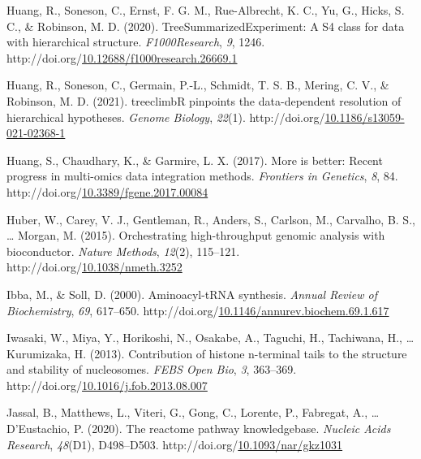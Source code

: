 \documentclass[12pt,twoside]{reedthesis}
\newlength{\cslhangindent}
\newenvironment{CSLReferences}[2] %
 {%
  \setlength{\parindent}{0pt}
  \ifodd #1 \everypar{\setlength{\hangindent}{\cslhangindent}}\ignorespaces\fi
  \ifnum #2 > 0
  \setlength{\parskip}{#2\baselineskip}
  \fi
 }%
 {}
\begin{document}
\begin{CSLReferences}{1}{0}
\leavevmode{}%
Huang, R., Soneson, C., Ernst, F. G. M., Rue-Albrecht, K. C., Yu, G., Hicks, S. C., \& Robinson, M. D. (2020). TreeSummarizedExperiment: A S4 class for data with hierarchical structure. \emph{F1000Research}, \emph{9}, 1246. http://doi.org/\href{https://doi.org/10.12688/f1000research.26669.1}{10.12688/f1000research.26669.1}

\leavevmode{}%
Huang, R., Soneson, C., Germain, P.-L., Schmidt, T. S. B., Mering, C. V., \& Robinson, M. D. (2021). treeclimbR pinpoints the data-dependent resolution of hierarchical hypotheses. \emph{Genome Biology}, \emph{22}(1). http://doi.org/\href{https://doi.org/10.1186/s13059-021-02368-1}{10.1186/s13059-021-02368-1}

\leavevmode{}%
Huang, S., Chaudhary, K., \& Garmire, L. X. (2017). More is better: Recent progress in multi-omics data integration methods. \emph{Frontiers in Genetics}, \emph{8}, 84. http://doi.org/\href{https://doi.org/10.3389/fgene.2017.00084}{10.3389/fgene.2017.00084}

\leavevmode{}%
Huber, W., Carey, V. J., Gentleman, R., Anders, S., Carlson, M., Carvalho, B. S., \ldots{} Morgan, M. (2015). Orchestrating high-throughput genomic analysis with bioconductor. \emph{Nature Methods}, \emph{12}(2), 115--121. http://doi.org/\href{https://doi.org/10.1038/nmeth.3252}{10.1038/nmeth.3252}

\leavevmode{}%
Ibba, M., \& Soll, D. (2000). Aminoacyl-tRNA synthesis. \emph{Annual Review of Biochemistry}, \emph{69}, 617--650. http://doi.org/\href{https://doi.org/10.1146/annurev.biochem.69.1.617}{10.1146/annurev.biochem.69.1.617}

\leavevmode{}%
Iwasaki, W., Miya, Y., Horikoshi, N., Osakabe, A., Taguchi, H., Tachiwana, H., \ldots{} Kurumizaka, H. (2013). Contribution of histone n-terminal tails to the structure and stability of nucleosomes. \emph{FEBS Open Bio}, \emph{3}, 363--369. http://doi.org/\href{https://doi.org/10.1016/j.fob.2013.08.007}{10.1016/j.fob.2013.08.007}

\leavevmode{}%
Jassal, B., Matthews, L., Viteri, G., Gong, C., Lorente, P., Fabregat, A., \ldots{} D'Eustachio, P. (2020). The reactome pathway knowledgebase. \emph{Nucleic Acids Research}, \emph{48}(D1), D498--D503. http://doi.org/\href{https://doi.org/10.1093/nar/gkz1031}{10.1093/nar/gkz1031}


\end{CSLReferences}
\end{document}
